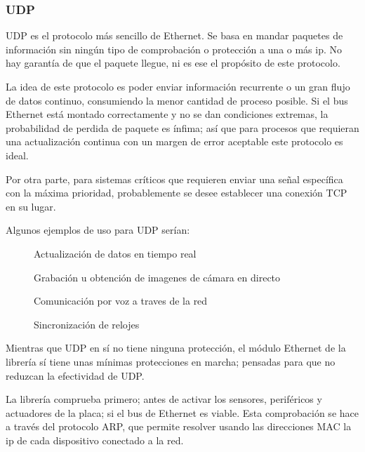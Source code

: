 \documentclass{report}
\begin{document}
\subsubsection{UDP}
UDP es el protocolo más sencillo de Ethernet. Se basa en mandar paquetes de información sin ningún tipo de comprobación o protección a una o más ip. No hay garantía de que el paquete llegue, ni es ese el propósito de este protocolo. 
\par \vspace{0.3cm}
La idea de este protocolo es poder enviar información recurrente o un gran flujo de datos continuo, consumiendo la menor cantidad de proceso posible. Si el bus Ethernet está montado correctamente y no se dan condiciones extremas, la probabilidad de perdida de paquete es ínfima; así que para procesos que requieran una actualización continua con un margen de error aceptable este protocolo es ideal. 
\par \vspace{0.3cm}
Por otra parte, para sistemas críticos que requieren enviar una señal específica con la máxima prioridad, probablemente se desee establecer una conexión TCP en su lugar. 
\par \vspace{0.3cm}
Algunos ejemplos de uso para UDP serían:
\begin{figure}[H]
\cdot \hspace{0.1cm} Actualización de datos en tiempo real \par
\cdot \hspace{0.1cm} Grabación u obtención de imagenes de cámara en directo \par
\cdot \hspace{0.1cm} Comunicación por voz a traves de la red \par
\cdot \hspace{0.1cm} Sincronización de relojes 
\label{UDPuses}
\end{figure}
\par \vspace{0.3cm}
Mientras que UDP en sí no tiene ninguna protección, el módulo Ethernet de la librería sí tiene unas mínimas protecciones en marcha; pensadas para que no reduzcan la efectividad de UDP.
\par
La librería comprueba primero; antes de activar los sensores, periféricos y actuadores de la placa; si el bus de Ethernet es viable. Esta comprobación se hace a través del protocolo ARP, que permite resolver usando las direcciones MAC la ip de cada dispositivo conectado a la red. 
\end{document}
